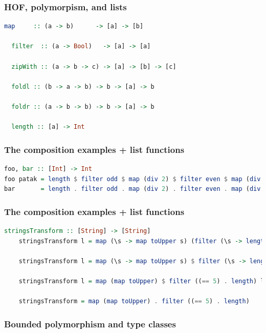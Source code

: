 \documentclass[10pt,pdf,utf8,russian,aspectratio=169]{beamer}
\begin{document}
\begin{frame}[fragile]
  \frametitle{HOF, polymorpism, and lists}

  \begin{lstlisting}[language=Haskell]
  map     :: (a -> b)      -> [a] -> [b]

  filter  :: (a -> Bool)   -> [a] -> [a]

  zipWith :: (a -> b -> c) -> [a] -> [b] -> [c]

  foldl :: (b -> a -> b) -> b -> [a] -> b

  foldr :: (a -> b -> b) -> b -> [a] -> b

  length :: [a] -> Int
  \end{lstlisting}

\vspace{\baselineskip}

\end{frame}

\begin{frame}[fragile]
    \frametitle{The composition examples + list functions}
\begin{lstlisting}[language=Haskell]
foo, bar :: [Int] -> Int
foo patak = length $ filter odd $ map (div 2) $ filter even $ map (div 7) patak
bar       = length . filter odd . map (div 2) . filter even . map (div 7)
\end{lstlisting}
\end{frame}

\begin{frame}[fragile]
    \frametitle{The composition examples + list functions}
    \begin{lstlisting}[language=Haskell]
    stringsTransform :: [String] -> [String]
    stringsTransform l = map (\s -> map toUpper s) (filter (\s -> length s == 5) l)

    stringsTransform l = map (\s -> map toUpper s) $ filter (\s -> length s == 5) l

    stringsTransform l = map (map toUpper) $ filter ((== 5) . length) l

    stringsTransform = map (map toUpper) . filter ((== 5) . length)
    \end{lstlisting}
\end{frame}

\begin{frame}
  \frametitle{Bounded polymorphism and type classes}


\end{frame}
\end{document}
